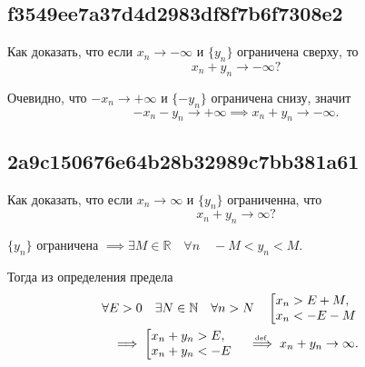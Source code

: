 \documentclass[11pt, a5paper]{article}
\newenvironment{note}[1]{\goodbreak\par\subsection{\hfill \color{lightgray}\tiny #1}}{}
\newenvironment{cloze}[2][\ldots]{\begin{leftbar}}{\end{leftbar}}
\begin{document}
    \begin{note}{f3549ee7a37d4d2983df8f7b6f7308e2}
        Как доказать, что если \( x_n \to -\infty \) и \( \{ y_n \} \) ограничена сверху, то \[
            x_n + y_n \to -\infty?
        \]

        \begin{cloze}{1}
            Очевидно, что \( -x_n \to +\infty  \) и \( \{ -y_n \} \)  ограничена снизу, значит \[
                -x_n - y_n \to +\infty \implies x_n + y_n \to -\infty.
            \]
        \end{cloze}
    \end{note}

    \begin{note}{2a9c150676e64b28b32989c7bb381a61}
        Как доказать, что если \( x_n \to \infty  \) и \( \{ y_n \} \) ограниченна, что \[
            x_n + y_n \to \infty?
        \]

        \begin{cloze}{1}
            \( \{ y_n \} \) ограничена \( \implies \exists M \in \mathbb R \quad \forall n \quad -M < y_n < M. \)

            Тогда из определения предела
            \begin{multline*}
                \forall E > 0 \quad \exists N \in \mathbb N \quad \forall n > N \quad \left[ {
                    \begin{array}{@{}l@{\quad}l@{}}
                        x_n > E + M, \\
                        x_n < -E - M
                    \end{array}
                } \right. \\
                \implies \left[ {
                    \begin{array}{@{}l@{\quad}l@{}}
                        x_n + y_n > E, \\
                        x_n + y_n < -E
                    \end{array}
                } \right.
                \overset{\!\!\text{\tiny def}}\implies x_n + y_n \to \infty.
            \end{multline*}
        \end{cloze}
    \end{note}
\end{document}
